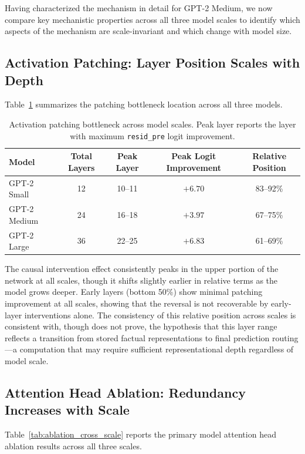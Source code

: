 \documentclass[11pt]{article}
\begin{document}
Having characterized the mechanism in detail for GPT-2 Medium, we now compare
key mechanistic properties across all three model scales to identify which
aspects of the mechanism are scale-invariant and which change with model size.

\subsection{Activation Patching: Layer Position Scales with Depth}

Table~\ref{tab:patching_comparison} summarizes the patching bottleneck location
across all three models.

\begin{table}[H]
\centering
\caption{Activation patching bottleneck across model scales. Peak layer reports
the layer with maximum \texttt{resid\_pre} logit improvement.}
\label{tab:patching_comparison}
\begin{tabular}{lcccc}
\toprule
\textbf{Model} & \textbf{Total Layers} & \textbf{Peak Layer} & \textbf{Peak Logit Improvement} & \textbf{Relative Position} \\
\midrule
GPT-2 Small  & 12 & 10--11 & $+6.70$ & 83--92\% \\
GPT-2 Medium & 24 & 16--18 & $+3.97$ & 67--75\% \\
GPT-2 Large  & 36 & 22--25 & $+6.83$ & 61--69\% \\
\bottomrule
\end{tabular}
\end{table}

The causal intervention effect consistently peaks in the upper portion of the
network at all scales, though it shifts slightly earlier in relative terms as the
model grows deeper. Early layers (bottom 50\%) show minimal patching improvement
at all scales, showing that the reversal is not recoverable by early-layer
interventions alone. The consistency of this relative position across scales is
consistent with, though does not prove, the hypothesis that this layer range
reflects a transition from stored factual representations to final prediction
routing---a computation that may require sufficient representational depth
regardless of model scale.

\subsection{Attention Head Ablation: Redundancy Increases with Scale}

Table~\ref{tab:ablation_cross_scale} reports the primary model attention head
ablation results across all three scales.
\end{document}
